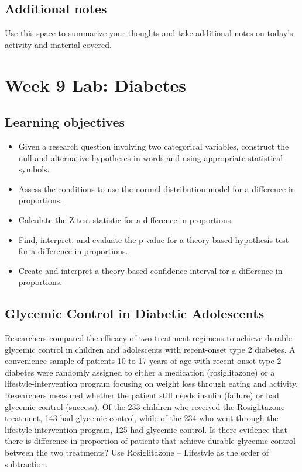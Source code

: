\documentclass[
]{report}
\begin{document}
\hypertarget{additional-notes-14}{%
\subsection{Additional notes}\label{additional-notes-14}}

Use this space to summarize your thoughts and take additional notes on today's activity and material covered.

\newpage

\hypertarget{week-9-lab-diabetes}{%
\section{Week 9 Lab: Diabetes}\label{week-9-lab-diabetes}}


\hypertarget{learning-objectives-15}{%
\subsection{Learning objectives}\label{learning-objectives-15}}

\begin{itemize}
\item
  Given a research question involving two categorical variables, construct the null and alternative hypotheses
  in words and using appropriate statistical symbols.
\item
  Assess the conditions to use the normal distribution model for a difference in proportions.
\item
  Calculate the Z test statistic for a difference in proportions.
\item
  Find, interpret, and evaluate the p-value for a theory-based hypothesis test for a difference in proportions.
\item
  Create and interpret a theory-based confidence interval for a difference in proportions.
\end{itemize}

\hypertarget{glycemic-control-in-diabetic-adolescents}{%
\subsection{Glycemic Control in Diabetic Adolescents}\label{glycemic-control-in-diabetic-adolescents}}

Researchers compared the efficacy of two treatment regimens to achieve durable glycemic control in children and adolescents with recent-onset type 2 diabetes. A convenience sample of patients 10 to 17 years of age with recent-onset type 2 diabetes were randomly assigned to either a medication (rosiglitazone) or a lifestyle-intervention program focusing on weight loss through eating and activity. Researchers measured whether the patient still needs insulin (failure) or had glycemic control (success). Of the 233 children who received the Rosiglitazone treatment, 143 had glycemic control, while of the 234 who went through the lifestyle-intervention program, 125 had glycemic control. Is there evidence that there is difference in proportion of patients that achieve durable glycemic control between the two treatments? Use Rosiglitazone -- Lifestyle as the order of subtraction.
\end{document}
